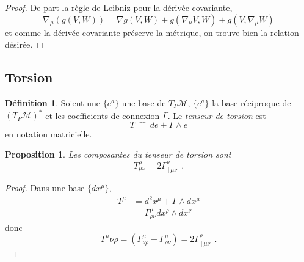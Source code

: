 \documentclass[a4paper,11pt]{report}
\theoremstyle{definition}
\theoremstyle{plain}
\newtheorem{prop}[thm]{Proposition}
\theoremstyle{definition}
\newtheorem{defn}{Définition}[chapter]
\theoremstyle{remark}
\newcommand{\M}{\mathscr{M}}
\begin{document}
                \begin{proof}
                    De part la règle de Leibniz pour la dérivée covariante,
                    \begin{equation}
                         \nabla_\mu(g(V,W)) = \nabla g(V,W) + g(\nabla_\mu V,W) + g(V,\nabla_\mu W)
                    \end{equation}
                    et comme la dérivée covariante préserve la métrique, on trouve bien la relation désirée.
                \end{proof}
            
            \subsection{Torsion}
            
                \begin{defn}
                    Soient une $\{e^a\}$ une base de $T_P\M$, $\{e^a\}$ la base réciproque de $(T_P\M)^*$ et les coefficients de connexion $\Gamma$. Le \textit{tenseur de torsion} est
                    \begin{equation}
                        T ~\hat{=}~ de+\Gamma\wedge e
                    \end{equation}
                    en notation matricielle.
                \end{defn}
                
                \begin{prop}
                    Les composantes du tenseur de torsion sont
                    \begin{equation}
                        T^\rho_{\mu\nu} = 2\Gamma^\rho_{[\mu\nu]}.
                    \end{equation}
                \end{prop}
                
                \begin{proof}
                    Dans une base $\{dx^\mu\}$,
                    \begin{align}
                        T^\mu &= d^2x^\mu + \Gamma\wedge dx^\mu\\
                        &= \Gamma^\mu_{\rho\nu}dx^\rho\wedge dx^\nu
                    \end{align}
                    donc
                    \begin{equation}
                        T^\mu{\nu\rho} = \left( \Gamma^\mu_{\nu\rho}-\Gamma^\mu_{\rho\nu} \right) = 2\Gamma^\rho_{[\mu\nu]}.
                    \end{equation}
                \end{proof}
                
\end{document}
